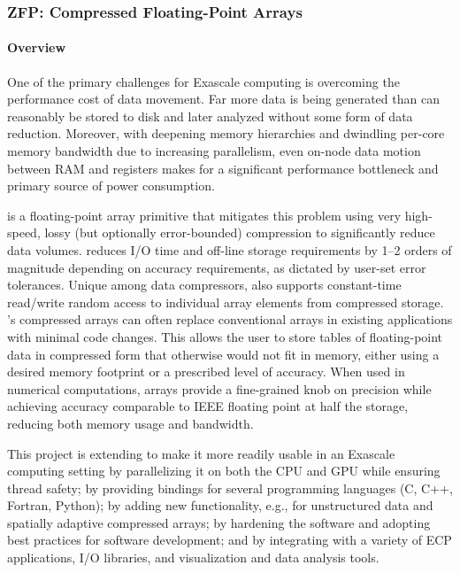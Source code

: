 \newcommand{\zfpmilestone}[1]{~(STDM16-#1)}

\subsubsection{ ZFP: Compressed Floating-Point Arrays}

\paragraph{Overview} 

One of the primary challenges for Exascale computing is overcoming the performance cost of data movement.  
Far more data is being generated than can reasonably be stored to disk and later analyzed without some form of data reduction.  
Moreover, with deepening memory hierarchies and dwindling per-core memory bandwidth due to increasing parallelism, even on-node data motion between RAM and registers makes for a significant performance bottleneck and primary source of power consumption.

{\zfp} is a floating-point array primitive that mitigates this problem using
very high-speed, lossy (but optionally error-bounded) compression to
significantly reduce data volumes.  {\zfp} reduces I/O time and off-line
storage requirements by 1--2 orders of magnitude depending on accuracy
requirements, as dictated by user-set error tolerances.  Unique among data
compressors, {\zfp} also supports constant-time read/write random access to
individual array elements from compressed storage.  {\zfp}'s compressed arrays
can often replace conventional arrays in existing applications with minimal
code changes.  This allows the user to store tables of floating-point
data in compressed form that otherwise would not fit in memory, either using
a desired memory footprint or a prescribed level of accuracy.  When used in
numerical computations, {\zfp} arrays provide a fine-grained knob on precision
while achieving accuracy comparable to IEEE floating point at half the
storage, reducing both memory usage and bandwidth.

This project is extending {\zfp} to make it more readily usable in an Exascale
computing setting by parallelizing it on both the CPU and GPU while ensuring
thread safety; by providing bindings for several programming languages (C,
C++, Fortran, Python); by adding new functionality, e.g., for unstructured
data and spatially adaptive compressed arrays; by hardening the software and
adopting best practices for software development; and by integrating {\zfp}
with a variety of ECP applications, I/O libraries, and visualization and data
analysis tools.


